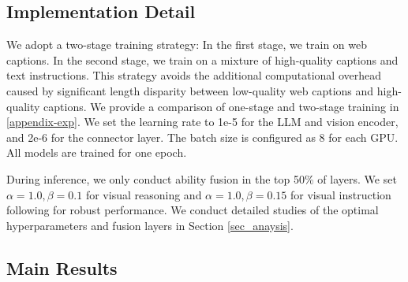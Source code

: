 \subsection{Implementation Detail}

We adopt a two-stage training strategy: In the first stage, we train on web captions. In the second stage, we train on a mixture of high-quality captions and text instructions. This strategy avoids the additional computational overhead caused by significant length disparity between low-quality web captions and high-quality captions. We provide a comparison of one-stage and two-stage training in \autoref{appendix-exp}. We set the learning rate to 1e-5 for the LLM and vision encoder, and 2e-6 for the connector layer. The batch size is configured as 8 for each GPU. All models are trained for one epoch.

During inference, we only conduct ability fusion in the top 50\% of layers. We set $\alpha=1.0, \beta=0.1$ for visual reasoning and $\alpha=1.0, \beta=0.15$ for visual instruction following for robust performance. We conduct detailed studies of the optimal hyperparameters and fusion layers in Section \ref{sec_anaysis}.






\subsection{Main Results}



\begin{table}[t]
  \centering
    \caption{The ablation of different training data component and inference strategy. AF inference indicates ability-fused inference.}
    \label{tab:table-ablation-af}
\end{table}

